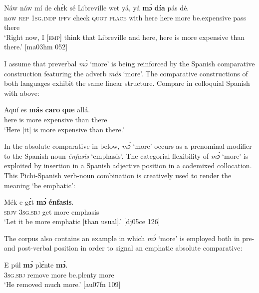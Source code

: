 \ea%
    \label{ex:key:472}
    \gll Náw    náw    mí    de  chɛ́k  sé    Libreville  wet    yá,
yá    \textbf{mɔ́}    \textbf{día}      pás  dé.\\
now    \textsc{rep}    \textsc{1sg.indp}  \textsc{ipfv}  check  \textsc{quot}    \textsc{place}    with    here
here    more  be.expensive  pass  there\\

\glt ‘Right now, I [\textsc{emp}] think that Libreville and here, here is more expensive
than there.’ [ma03hm 052]
\z

I assume that preverbal \textit{mɔ́} ‘more’ is being reinforced by the Spanish comparative construction featuring the adverb \textit{más} ‘more’. The comparative constructions of both languages exhibit the same linear structure. Compare  in colloquial Spanish with  above:


\ea%
    \label{ex:key:473}
    \gll Aquí  es     \textbf{más}    \textbf{caro}      \textbf{que}    allá.\\
here    is    more  expensive  than  there\\

\glt ‘Here [it] is more expensive than there.’
\z

In the absolute comparative in  below, \textit{mɔ́} ‘more’ occurs as a prenominal modifier to the Spanish noun \textit{énfasis} ‘emphasis’. The categorial flexibility of \textit{mɔ́} ‘more’ is exploited by insertion in a Spanish adjective position in a codemixed collocation. This Pichi-Spanish verb-noun combination is creatively used to render the meaning ‘be emphatic’:


\ea%
    \label{ex:key:474}
    \gll Mék    e    gɛ́t  \textbf{mɔ́}    \textbf{énfasis}.\\
\textsc{sbjv}    \textsc{3sg.sbj}  get  more  emphasis\\

\glt ‘Let it be more emphatic [than usual].’ [dj05ce 126]
\z

The corpus also contains an example in which \textit{mɔ́} ‘more’ is employed both in pre- and post-verbal position in order to signal an emphatic absolute comparative:


\ea%
    \label{ex:key:475}
    \gll E    púl    \textbf{mɔ́}    plɛ́nte    \textbf{mɔ́}.\\
\textsc{3sg.sbj}  remove  more  be.plenty  more\\

\glt ‘He removed much more.’ [au07fn 109]
\z

